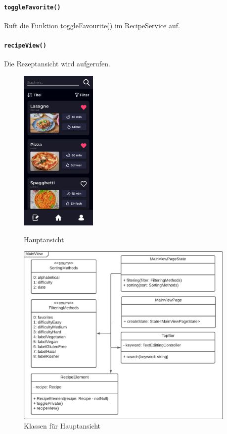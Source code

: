 \documentclass{entwurfsheft}
\begin{document}
            \paragraph*{\texttt{toggleFavorite()}} Ruft die Funktion toggleFavourite() im RecipeService auf.
            \paragraph*{\texttt{recipeView()}} Die Rezeptansicht wird aufgerufen.

    \begin{figure}[htp]
        \begin{minipage}
            [t]{0.49\textwidth}
            \centering
            \includegraphics[height=80mm]{images/Presentation-layer/MainView.jpg}
            \caption{Hauptansicht}
        \end{minipage}
        \begin{minipage}
            [t]{0.49\textwidth}
            \centering
            \includegraphics[width=0.95\textwidth]{images/Presentation-layer/MainViewClass.pdf}
            \caption{Klassen für Hauptansicht}
        \end{minipage}
    \end{figure}
\end{document}
